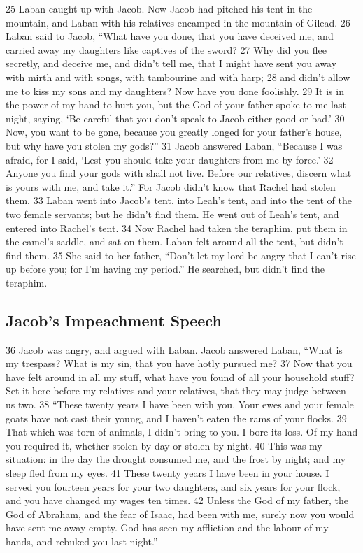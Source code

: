 {25} Laban caught up with Jacob. Now Jacob had pitched his tent in the
mountain, and Laban with his relatives encamped in the mountain of
Gilead. {26} Laban said to Jacob, ``What have you done, that you have
deceived me, and carried away my daughters like captives of the sword?
{27} Why did you flee secretly, and deceive me, and didn't tell me, that
I might have sent you away with mirth and with songs, with tambourine
and with harp; {28} and didn't allow me to kiss my sons and my
daughters? Now have you done foolishly. {29} It is in the power of my
hand to hurt you, but the God of your father spoke to me last night,
saying, `Be careful that you don't speak to Jacob either good or bad.'
{30} Now, you want to be gone, because you greatly longed for your
father's house, but why have you stolen my gods?'' {31} Jacob answered
Laban, ``Because I was afraid, for I said, `Lest you should take your
daughters from me by force.' {32} Anyone you find your gods with shall
not live. Before our relatives, discern what is yours with me, and take
it.'' For Jacob didn't know that Rachel had stolen them. {33} Laban went
into Jacob's tent, into Leah's tent, and into the tent of the two female
servants; but he didn't find them. He went out of Leah's tent, and
entered into Rachel's tent. {34} Now Rachel had taken the teraphim, put
them in the camel's saddle, and sat on them. Laban felt around all the
tent, but didn't find them. {35} She said to her father, ``Don't let my
lord be angry that I can't rise up before you; for I'm having my
period.'' He searched, but didn't find the teraphim.

\hypertarget{jacobs-impeachment-speech}{%
\subsection{Jacob's Impeachment
Speech}\label{jacobs-impeachment-speech}}

{36} Jacob was angry, and argued with Laban. Jacob answered Laban,
``What is my trespass? What is my sin, that you have hotly pursued me?
{37} Now that you have felt around in all my stuff, what have you found
of all your household stuff? Set it here before my relatives and your
relatives, that they may judge between us two. {38} ``These twenty years
I have been with you. Your ewes and your female goats have not cast
their young, and I haven't eaten the rams of your flocks. {39} That
which was torn of animals, I didn't bring to you. I bore its loss. Of my
hand you required it, whether stolen by day or stolen by night. {40}
This was my situation: in the day the drought consumed me, and the frost
by night; and my sleep fled from my eyes. {41} These twenty years I have
been in your house. I served you fourteen years for your two daughters,
and six years for your flock, and you have changed my wages ten times.
{42} Unless the God of my father, the God of Abraham, and the fear of
Isaac, had been with me, surely now you would have sent me away empty.
God has seen my affliction and the labour of my hands, and rebuked you
last night.''

